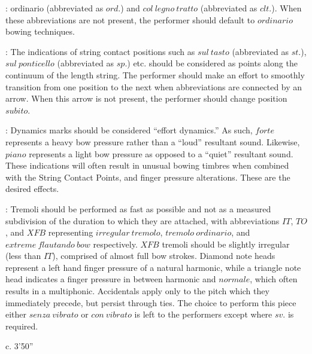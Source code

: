 \documentclass[11pt]{article}
\newcommand*\circled[1]{\tikz[baseline=(char.base)]{
            \node[shape=circle,draw,inner sep=1pt] (char) {#1};}}
\begin{document}
\begingroup
\begin{center}
 : \circled{1} ordinario (abbreviated as $ord.$) and \circled{2} $col \ legno \ tratto$ (abbreviated as $clt.$). When these abbreviations are not present, the performer should default to $ordinario$ bowing techniques.
\rightskip\leftskip
\phantom{text} \hfill \phantom{()}

 : The indications of string contact positions such as $sul \ tasto$ (abbreviated as $st.$), $sul \ ponticello$ (abbreviated as $sp.$) etc. should be considered as points along the continuum of the length string. The performer should make an effort to smoothly transition from one position to the next when abbreviations are connected by an arrow. When this arrow is not present, the performer should change position $subito$.
\rightskip\leftskip
\phantom{text} \hfill \phantom{()}

 : Dynamics marks should be considered ``effort dynamics.'' As such, $forte$ represents a heavy bow pressure rather than a ``loud'' resultant sound. Likewise, $piano$ represents a light bow pressure as opposed to a ``quiet'' resultant sound. These indications will often result in unusual bowing timbres when combined with the String Contact Points, and finger pressure alterations. These are the desired effects.
\rightskip\leftskip
\phantom{text} \hfill \phantom{()}

 : \circled{1} Tremoli should be performed as fast as possible and not as a measured subdivision of the duration to which they are attached, with abbreviations $IT$, $TO$, and $XFB$ representing $irregular \ tremolo$, $tremolo \ ordinario$, and $extreme \ flautando \ bow$ respectively. $XFB$ tremoli should be slightly irregular (less than $IT$), comprised of almost full bow strokes. \circled{2} Diamond note heads represent a left hand finger pressure of a natural harmonic, \circled{3} while a triangle note head indicates a finger pressure in between harmonic and $normale$, which often results in a multiphonic. \circled{4} Accidentals apply only to the pitch which they immediately precede, but persist through ties. \circled{5} The choice to perform this piece either $senza \ vibrato$ or $con \ vibrato$ is left to the performers except where $sv.$ is required.
\rightskip\leftskip
\phantom{text} \hfill \phantom{()}
\end{center}
\endgroup

\vspace*{17\baselineskip}

\begin{center}
c. 3'50''
\end{center}

\vspace*{17\baselineskip}
\end{document}
